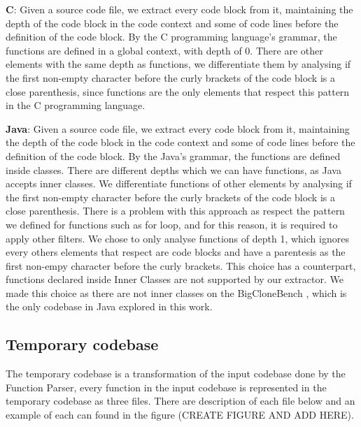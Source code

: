 \begin{itemize}
	\begin{item}
		\textbf{C}: Given a source code file, we extract every code block from it, maintaining the depth of the code block in
		the code context and some of code lines before the definition of the code block. By the C programming language's grammar, 
		the functions are defined in a global context, with depth of 0. There are other elements with the same depth as functions,
		we differentiate them by analysing if the first non-empty character before the curly brackets of the code block is a close 
		parenthesis, since functions are the only elements that respect this pattern in the C programming language.
	\end{item}
	\begin{item}
		\textbf{Java}: Given a source code file, we extract every code block from it, maintaining the depth of the code block in
		the code context and some of code lines before the definition of the code block. By the Java's grammar, 
		the functions are defined inside classes. There are different depths which we can have functions, as Java accepts inner
		classes. We differentiate functions of other elements by analysing if the first non-empty character before the curly brackets of the code block is a close 
		parenthesis. There is a problem with this approach as respect the pattern we defined for functions such as for loop, 
		and for this reason, it is required to apply other filters.
		We chose to only analyse functions of depth 1, which ignores every others elements that respect are code blocks and have
		a parentesis as the first non-empy character before the curly brackets. This choice has a counterpart, 
		functions declared inside Inner Classes are not supported by our extractor. We made this choice
		as there are not inner classes on the BigCloneBench \citep{bigclonebench}, which is the only codebase in Java explored in this work. 

	\end{item}
\end{itemize}

\subsection{Temporary codebase}

The temporary codebase is a transformation of the input codebase done by the Function Parser, every function in the input codebase
is represented in the temporary codebase as three files. There are description of each file below and an example of each can found
in the figure (CREATE FIGURE AND ADD HERE).


